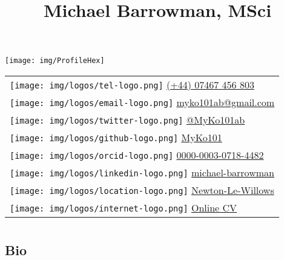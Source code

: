\documentclass[
]{article}
\title{Michael Barrowman, MSci}
\author{}
\date{\vspace{-2.5em}}
\begin{document}
\maketitle

\newcommand{\bcols}{\begin{multicols}{2}}
\newcommand{\ecols}{\end{multicols} }
\newcommand{\iimg}[1]{\texttt{[image: \#1]}}
\renewcommand{\arraystretch}{1.7}

\setlength{\columnsep}{-2.5cm}
\def\addlinespace{}

\begin{multicols}{2}

\texttt{[image: img/ProfileHex]}

\begin{tabular}{l}
\toprule
\texttt{[image:  img/logos/tel-logo.png]} \href{ tel:+447467456803}{ (+44) 07467 456 803}\\
\texttt{[image:  img/logos/email-logo.png]} \href{ mailto:myko101ab@gmail.com}{ myko101ab@gmail.com}\\
\texttt{[image:  img/logos/twitter-logo.png]} \href{ https://twitter.com/MyKo101ab}{ @MyKo101ab}\\
\texttt{[image:  img/logos/github-logo.png]} \href{ https://github.com/MyKo101}{ MyKo101}\\
\texttt{[image:  img/logos/orcid-logo.png]} \href{ https://orcid.org/0000-0003-0718-4482}{ 0000-0003-0718-4482}\\

\texttt{[image:  img/logos/linkedin-logo.png]} \href{ https://www.linkedin.com/in/michael-barrowman-0403a960/}{ michael-barrowman}\\
\texttt{[image:  img/logos/location-logo.png]} \href{ https://www.google.com/maps/place/Newton-le-Willows/@53.4584287,-2.6730042}{ Newton-Le-Willows}\\
\texttt{[image:  img/logos/internet-logo.png]} \href{ https://MichaelBarrowman.co.uk/CV/index.html}{ Online CV}\\
\bottomrule
\end{tabular}

\hypertarget{section}{%
\section{}\label{section}}

\hypertarget{bio}{%
\subsection{Bio}\label{bio}}


\end{multicols}
\end{document}
